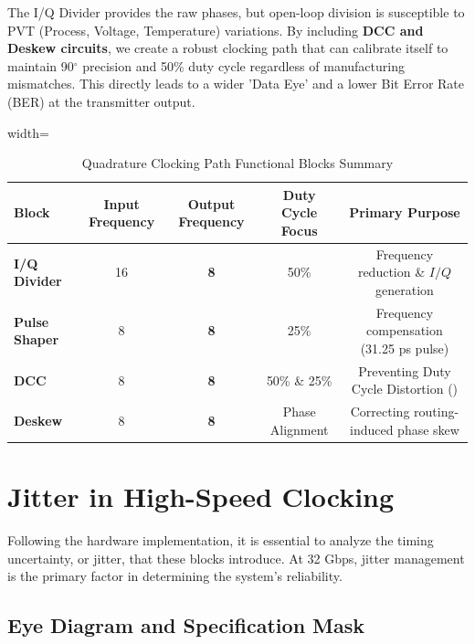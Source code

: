 \documentclass[12pt, a4paper]{report}
\newcommand{\GHz}{\text{GHz}}
\newcommand{\DCD}{\text{DCD}}
\begin{document}
The I/Q Divider provides the raw phases, but open-loop division is susceptible to PVT (Process, Voltage, Temperature) variations. By including \textbf{DCC and Deskew circuits}, we create a robust clocking path that can calibrate itself to maintain 90\(^\circ\) precision and 50\% duty cycle regardless of manufacturing mismatches. This directly leads to a wider 'Data Eye' and a lower Bit Error Rate (BER) at the transmitter output.


\begin{table}[ht]
    \centering
    \caption{Quadrature Clocking Path Functional Blocks Summary}
    \label{tab:clocking-blocks}
    \begin{adjustbox}{width=\textwidth}
    \begin{tabular}{lcccc}
        \toprule
        \textbf{Block} & \textbf{Input Frequency} & \textbf{Output Frequency} & \textbf{Duty Cycle Focus} & \textbf{Primary Purpose} \\
        \midrule
        \textbf{I/Q Divider} & 16 \GHz & \textbf{8 \GHz} & 50\% & Frequency reduction \& \(I/Q\) generation \\
        \textbf{Pulse Shaper} & 8 \GHz & \textbf{8 \GHz} & 25\% & Frequency compensation (31.25 ps pulse) \\
        \textbf{DCC} & 8 \GHz & \textbf{8 \GHz} & 50\% \& 25\% & Preventing Duty Cycle Distortion (\DCD) \\
        \textbf{Deskew} & 8 \GHz & \textbf{8 \GHz} & Phase Alignment & Correcting routing-induced phase skew \\
        \bottomrule
    \end{tabular}
    \end{adjustbox}
\end{table}

\section{Jitter in High-Speed Clocking}
\label{sec:jitter-analysis}

Following the hardware implementation, it is essential to analyze the timing uncertainty, or jitter, that these blocks introduce. At 32 Gbps, jitter management is the primary factor in determining the system's reliability.

\subsection{Eye Diagram and Specification Mask}
\label{subsec:eye-diagram}
\end{document}
